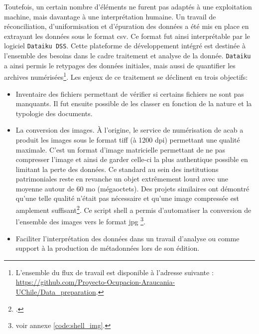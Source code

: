 	Toutefois, un certain nombre d'éléments ne furent pas adaptés à une exploitation machine, mais davantage à une interprétation humaine. Un travail de réconciliation, d'uniformisation et d'épuration des données a été mis en place en extrayant les données sous le format \gls{csv}. Ce format fut ainsi interprétable par le logiciel \texttt{Dataiku DSS}. Cette plateforme de développement intégré est destinée à l'ensemble des besoins dans le cadre traitement et analyse de la donnée. \texttt{Dataiku} a ainsi permis le retypages des données initiales, mais aussi de quantifier les archives numérisées\footnote{L'ensemble du flux de travail est disponible à l'adresse suivante : \url{https://github.com/Proyecto-Ocupacion-Araucania-UChile/Data_preparation}.}. Les enjeux de ce traitement se déclinent en trois objectifs: \\
	\begin{itemize}
	    \item Inventaire des fichiers permettant de vérifier si certains fichiers ne sont pas manquants. Il fut ensuite possible de les classer en fonction de la nature et la typologie des documents.
	    \item La conversion des images. À l'origine, le service de numérisation de \gls{acab} a produit les images sous le format \gls{tiff} (à 1200 dpi) permettant une qualité maximale. C'est un format d'image matricielle permettant de ne pas compresser l'image et ainsi de garder celle-ci la plus authentique possible en limitant la perte des données. Ce standard au sein des institutions patrimoniales reste en revanche un objet extrêmement lourd avec une moyenne autour de 60 mo (mégaoctets). Des projets similaires ont démontré qu'une telle qualité n'était pas nécessaire et qu'une image compressée est amplement suffisant\footcite{n.c.ExperimentationsLECTAUREP, chiffoleauDAHNProjectDigital2022}. Ce script shell a permis d'automatiser la conversion de l'ensemble des images vers le format \gls{jpg} \footnote{voir annexe \ref{code:shell_img}.}.
        \item Faciliter l'interprétation des données dans un travail d'analyse ou comme support à la production de métadonnées lors de son édition. \\
	\end{itemize}
	
